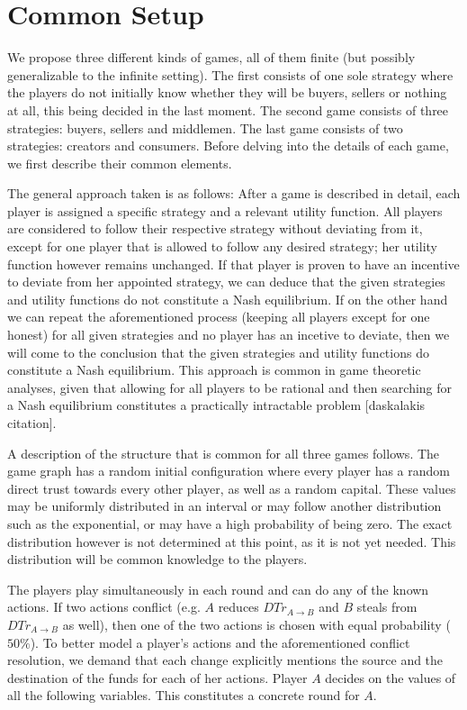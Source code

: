 \section{Common Setup}
  We propose three different kinds of games, all of them finite (but possibly generalizable to the infinite setting). The first
  consists of one sole strategy where the players do not initially know whether they will be buyers, sellers or nothing at all,
  this being decided in the last moment. The second game consists of three strategies: buyers, sellers and middlemen. The last
  game consists of two strategies: creators and consumers. Before delving into the details of each game, we first describe their
  common elements.
  
  The general approach taken is as follows: After a game is described in detail, each player is assigned a specific strategy and
  a relevant utility function. All players are considered to follow their respective strategy without deviating from it, except
  for one player that is allowed to follow any desired strategy; her utility function however remains unchanged. If that player
  is proven to have an incentive to deviate from her appointed strategy, we can deduce that the given strategies and utility
  functions do not constitute a Nash equilibrium. If on the other hand we can repeat the aforementioned process (keeping all
  players except for one honest) for all given strategies and no player has an incetive to deviate, then we will come to the
  conclusion that the given strategies and utility functions do constitute a Nash equilibrium. This approach is common in game
  theoretic analyses, given that allowing for all players to be rational and then searching for a Nash equilibrium constitutes a
  practically intractable problem [daskalakis citation].
  
  A description of the structure that is common for all three games follows. The game graph has a random initial configuration
  where every player has a random direct trust towards every other player, as well as a random capital. These values may be
  uniformly distributed in an interval or may follow another distribution such as the exponential, or may have a high
  probability of being zero. The exact distribution however is not determined at this point, as it is not yet needed. This
  distribution will be common knowledge to the players.
  
  The players play simultaneously in each round and can do any of the known actions. If two actions conflict (e.g. $A$ reduces
  $DTr_{A \rightarrow B}$ and $B$ steals from $DTr_{A \rightarrow B}$ as well), then one of the two actions is chosen with equal
  probability ($50\%$). To better model a player's actions and the aforementioned conflict resolution, we demand that each
  change explicitly mentions the source and the destination of the funds for each of her actions. Player $A$ decides on the
  values of all the following variables. This constitutes a concrete round for $A$.
  
